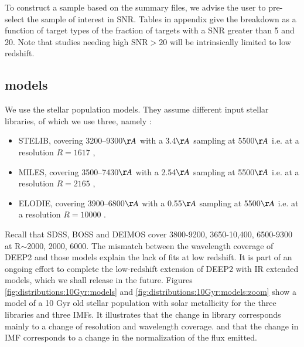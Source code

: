 \documentclass[onecolumn]{aa}
\begin{document}
To construct a sample based on the summary files, we advise the user to pre-select the sample of interest in SNR. Tables in appendix give the breakdown as a function of target types of the fraction of targets with a SNR greater than 5 and 20. Note that studies needing high SNR$>20$ will be intrinsically limited to low redshift.

\subsection{\citet{Maraston_2011} models}

We use the \citet{Maraston_2011} stellar population models. 
They assume different input stellar libraries, of which we use three, namely :
\begin{itemize}
\item STELIB, covering 3200–9300$\AA$ with a 3.4$\AA$ sampling at 5500$\AA$ i.e. at a resolution $R=1617$ \citep{leborgne2003},  
\item MILES, covering 3500–7430$\AA$ with a 2.54$\AA$ sampling at 5500$\AA$ i.e. at a resolution $R=2165$ \citep{MILES_2006,MILES_2011},
\item ELODIE, covering 3900–6800$\AA$ with a 0.55$\AA$ sampling at 5500$\AA$ i.e. at a resolution $R=10000$ \citep{Prugniel2007}.
\end{itemize}
Recall that SDSS, BOSS and DEIMOS cover 3800-9200, 3650-10,400, 6500-9300 at R$\sim$2000, 2000, 6000. The mismatch between the wavelength coverage of DEEP2 and those models explain the lack of fits at low redshift. It is part of an ongoing effort to complete the low-redshift extension of DEEP2 with IR extended models, which we shall release in the future.
Figures \ref{fig:distributions:10Gyr:models} and \ref{fig:distributions:10Gyr:models:zoom} show a model of a 10 Gyr old stellar population with solar metallicity for the three libraries and three IMFs. It illustrates that the change in library corresponds mainly to a change of resolution and wavelength coverage. and that the change in IMF corresponds to a change in the normalization of the flux emitted.
\end{document}
